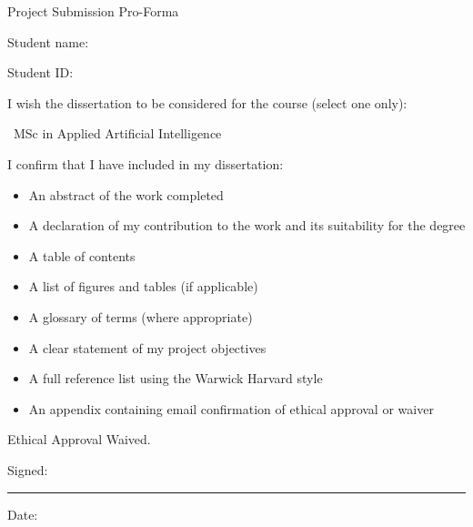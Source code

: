 \begin{titlepage}
\thispagestyle{empty}
{\fontsize{16}{19}\selectfont\color{wmgblue}Project Submission Pro-Forma}

\vspace{1.2cm}
Student name: \studentname

Student ID: \studentid

\vspace{0.4cm}
I wish the dissertation to be considered for the course (select one only):

\checkedbox\ MSc in Applied Artificial Intelligence

\vspace{0.4cm}
I confirm that I have included in my dissertation:

\begin{itemize}[leftmargin=2em]
  \item[\checkedbox] An abstract of the work completed
  \item[\checkedbox] A declaration of my contribution to the work and its suitability for the degree
  \item[\checkedbox] A table of contents
  \item[\checkedbox] A list of figures and tables (if applicable)
  \item[\emptybox] A glossary of terms (where appropriate)
  \item[\checkedbox] A clear statement of my project objectives
  \item[\checkedbox] A full reference list using the Warwick Harvard style
  \item[\checkedbox] An appendix containing email confirmation of ethical approval or waiver
\end{itemize}

Ethical Approval Waived.

\vfill
Signed: \rule{6cm}{0.4pt}\hfill Date: \submissiondate
\end{titlepage}
